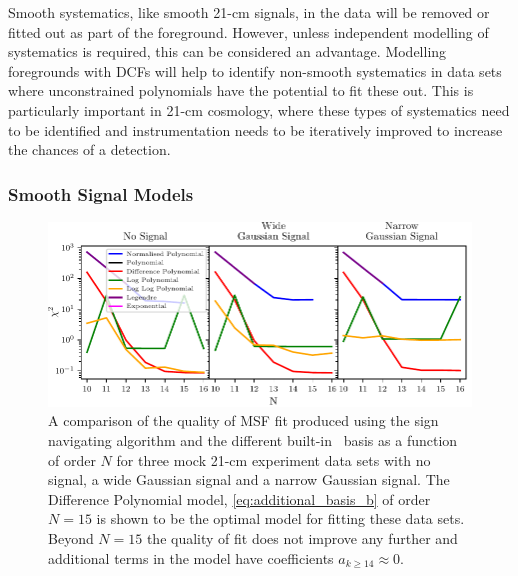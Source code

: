 
Smooth systematics, like smooth 21-cm signals, in the data will be removed or fitted out as part of the foreground. However, unless independent modelling of systematics is required, this can be considered an advantage. Modelling foregrounds with DCFs will help to identify non-smooth systematics in data sets where unconstrained polynomials have the potential to fit these out. This is particularly important in 21-cm cosmology, where these types of systematics need to be identified and instrumentation needs to be iteratively improved to increase the chances of a detection.

\subsubsection{Smooth Signal Models}
\label{sec:limitations}

\begin{figure}
\centering
    \includegraphics{maxsmooth/figs/Fig9_basis.pdf}
    \caption{A comparison of the quality of MSF fit produced using the sign navigating algorithm and the different built-in \maxsmooth~basis as a function of order $N$ for three mock 21-cm experiment data sets with no signal, a wide Gaussian signal and a narrow Gaussian signal. The Difference Polynomial model, \cref{eq:additional_basis_b} of order $N = 15$ is shown to be the optimal model for fitting these data sets. Beyond $N = 15$ the quality of fit does not improve any further and additional terms in the model have coefficients $a_{k \geq 14} \approx 0$.}
    \label{fig:fig9_bestbasis}
\end{figure}

